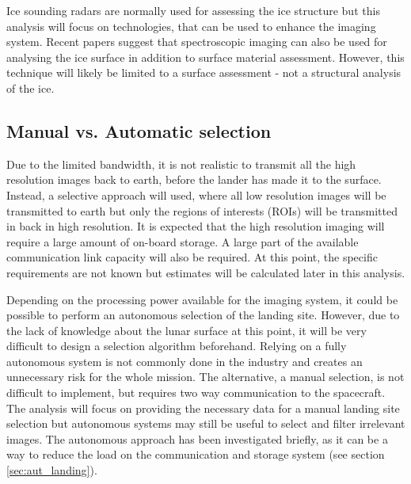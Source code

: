\begin{description}
    Ice sounding radars are normally used for assessing the ice structure but this analysis will focus on technologies, that can be used to enhance the imaging system. Recent papers suggest that spectroscopic imaging can also be used for analysing the ice surface \cite{naegeli2015a} in addition to surface material assessment. However, this technique will likely be limited to a surface assessment - not a structural analysis of the ice.
\end{description}
\subsection{Manual vs. Automatic selection}
Due to the limited bandwidth, it is not realistic to transmit all the high resolution images back to earth, before the lander has made it to the surface. Instead, a selective approach will used, where all low resolution images will be transmitted to earth but only the regions of interests (ROIs) will be transmitted in back in high resolution. It is expected that the high resolution imaging will require a large amount of on-board storage. A large part of the available communication link capacity will also be required. At this point, the specific requirements are not known but estimates will be calculated later in this analysis.

Depending on the processing power available for the imaging system, it could be possible to perform an autonomous selection of the landing site. However, due to the lack of knowledge about the lunar surface at this point, it will be very difficult to design a selection algorithm beforehand. Relying on a fully autonomous system is not commonly done in the industry and creates an unnecessary risk for the whole mission. The alternative, a manual selection, is not difficult to implement, but requires two way communication to the spacecraft. The analysis will focus on providing the necessary data for a manual landing site selection but autonomous systems may still be useful to select and filter irrelevant images. The autonomous approach has been investigated briefly, as it can be a way to reduce the load on the communication and storage system (see section \ref{sec:aut_landing}).

